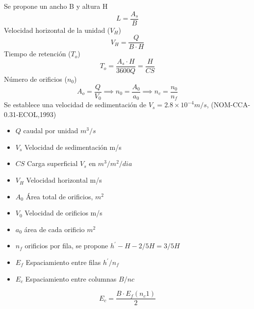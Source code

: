 Se propone un ancho B y altura H
\begin{equation}
    L = \frac{A_s}{B}
\end{equation}
Velocidad horizontal de la unidad ($V_H$)
\begin{equation}
    V_H =\frac{Q}{B \cdot H}
\end{equation}
Tiempo de retención ($T_o$)
\begin{equation}
    T_o = \frac{A_s \cdot H}{3600Q} = \frac{H}{CS}
\end{equation}
Número de orificios ($n_0$)
\begin{equation}
    A_o = \frac{Q}{V_0}\implies n_0 = \frac{A_0}{a_0}\implies n_c =\frac{n_0}{n_f}
\end{equation}
Se establece una velocidad de sedimentación de $V_s=2.8\times 10^{-4}m/s$, (NOM-CCA-0.31-ECOL,1993)
\begin{notation}
    \begin{itemize}
        \item $Q$ caudal por unidad $m^3/s$
        \item $V_s$ Velocidad de sedimentación m/s
        \item $CS$ Carga superficial $V_s$ en $m^3/m^2/dia$
        \item $V_H$ Velocidad horizontal m/s
        \item $A_0$ Área total de orificios, $m^2$
        \item $V_0$ Velocidad de orificios m/s
        \item $a_0$ área de cada orificio $m^2$
        \item $n_f$ orificios por fila, se propone $h^{\prime}-H-2/5H=3/5H$
        \item $E_f$ Espaciamiento entre filas $h^{\prime}/n_f$
        \item $E_c$ Espaciamiento entre columnas $B/nc$
    \end{itemize}
\end{notation}
\begin{equation}
    E_c =\frac{B \cdot E_f\left(n_c 1\right)}{2}
\end{equation}
